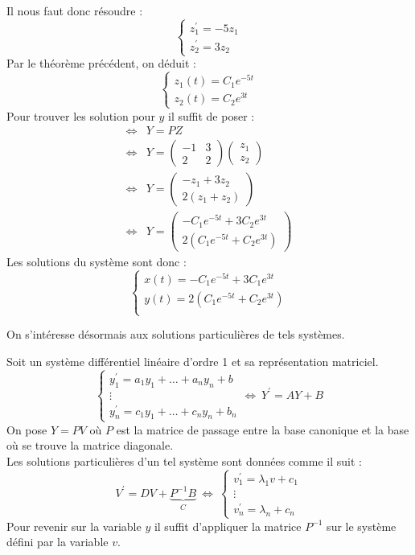 \begin{ex}
Il nous faut donc résoudre :
$$\begin{cases}
z_1^{\prime}=-5z_1\\
z_2^{\prime}=3z_2
\end{cases}$$
Par le théorème précédent, on déduit :
$$\begin{cases}
z_1(t)=C_1 e^{-5t}\\
z_2(t)=C_2 e^{3t}
\end{cases}$$
Pour trouver les solution pour $y$ il suffit de poser :
\begin{align*}
    \Leftrightarrow & Y=PZ\\
    \Leftrightarrow & Y=\begin{pmatrix}-1&3\\2&2\end{pmatrix}\begin{pmatrix}z_1\\z_2\end{pmatrix}\\
    \Leftrightarrow & Y=\begin{pmatrix}-z_1+3z_2\\2(z_1+z_2)\end{pmatrix}\\
    \Leftrightarrow & Y=\begin{pmatrix}-C_1e^{-5t}+3C_2e^{3t}\\2(C_1e^{-5t}+C_2e^{3t})\end{pmatrix}
\end{align*}
Les solutions du système sont donc :
$$\begin{cases}
x(t)=-C_1e^{-5t}+3C_1e^{3t}\\
y(t)=2(C_1e^{-5t}+C_2e^{3t})\\
\end{cases}$$
\end{ex}
On s'intéresse désormais aux solutions particulières de tels systèmes.
\begin{thm}[Théorème]
Soit un système différentiel linéaire d'ordre 1 et sa représentation matriciel.
$$
\begin{cases}
y_1^{\prime}=a_1 y_1 +\hdots+a_n y_n + b\\
\vdots\\
y_{n}^{\prime}=c_1 y_1 +\hdots+c_n y_n + b_n
\end{cases}\Leftrightarrow\ Y^{\prime}=AY+B$$
On pose $Y=PV$ où $P$ est la matrice de passage entre la base canonique et la base où se trouve la matrice diagonale.\\
Les solutions particulières d'un tel système sont données comme il suit :
$$V^{\prime}=DV+\underbrace{P^{-1}B}_{C}\ \Leftrightarrow\ 
\begin{cases}
v_1^{\prime}=\lambda_1 v+c_1\\
\vdots\\
v_{n}^{\prime}=\lambda_n +c_n
\end{cases}$$
Pour revenir sur la variable $y$ il suffit d'appliquer la matrice $P^{-1}$ sur le système défini par la variable $v$.
\end{thm}
